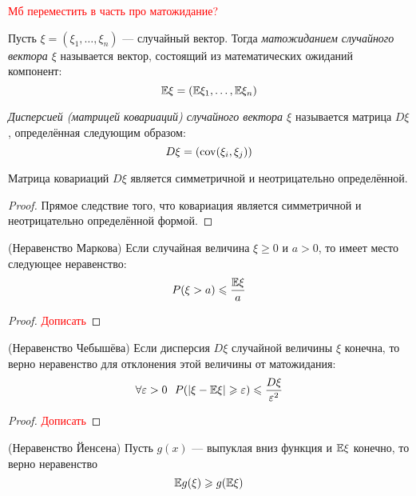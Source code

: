 \textcolor{red}{Мб переместить в часть про матожидание?}

\begin{definition}
	Пусть $\xi = (\xi_1, \ldots, \xi_n)$ --- случайный вектор. Тогда \textit{матожиданием случайного вектора $\xi$} называется вектор, состоящий из математических ожиданий компонент:
	\[
		\mathbb{E}\xi = (\mathbb{E}\xi_1, \ldots, \mathbb{E}\xi_n)
	\]
\end{definition}

\begin{definition}
	\textit{Дисперсией (матрицей ковариаций) случайного вектора $\xi$} называется матрица $D\xi$, определённая следующим образом:
	\[
		D\xi = (\operatorname{cov}(\xi_i, \xi_j))
	\]
\end{definition}

\begin{proposition}
	Матрица ковариаций $D\xi$ является симметричной и неотрицательно определённой.
\end{proposition}

\begin{proof}
	Прямое следствие того, что ковариация является симметричной и неотрицательно определённой формой.
\end{proof}

\begin{proposition} (Неравенство Маркова)
	Если случайная величина $\xi \ge 0$ и $a > 0$, то имеет место следующее неравенство:
	\[
		P(\xi > a) \leqslant \frac{\mathbb{E}\xi}{a}
	\]
\end{proposition}

\begin{proof}
	\textcolor{red}{Дописать}
\end{proof}

\begin{proposition} (Неравенство Чебышёва)
	Если дисперсия $D\xi$ случайной величины $\xi$ конечна, то верно неравенство для отклонения этой величины от матожидания:
	\[
		\forall \varepsilon > 0\ \ P(|\xi - \mathbb{E}\xi| \geqslant \varepsilon) \leqslant \frac{D\xi}{\varepsilon^2}
	\]
\end{proposition}

\begin{proof}
	\textcolor{red}{Дописать}
\end{proof}

\begin{proposition} (Неравенство Йенсена)
	Пусть $g(x)$ --- выпуклая вниз функция и $\mathbb{E}\xi$ конечно, то верно неравенство
	\[
		\mathbb{E} g(\xi) \geqslant g(\mathbb{E}\xi)
	\]
\end{proposition}

